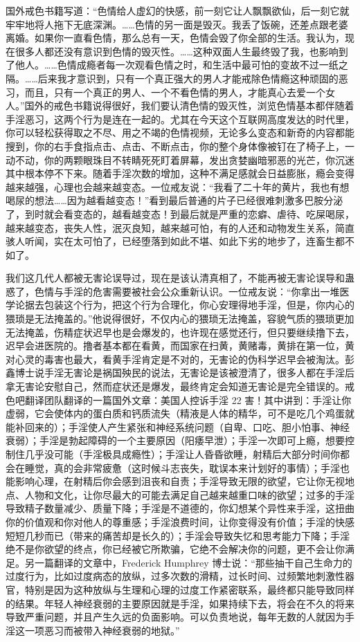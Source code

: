 国外戒色书籍写道：“色情给人虚幻的快感，前一刻它让人飘飘欲仙，后一刻它就牢牢地将人拖下无底深渊。……色情的另一面是毁灭。我丢了饭碗，还差点跟老婆离婚。如果你一直看色情，那么总有一天，色情会毁了你全部的生活。我认为，现在很多人都还没有意识到色情的毁灭性。……这种双面人生最终毁了我，也影响到了他人。……色情成瘾者每一次观看色情之时，和生活中最可怕的变故不过一纸之隔。……后来我才意识到，只有一个真正强大的男人才能戒除色情瘾这种顽固的恶习，而且，只有一个真正的男人、一个不看色情的男人，才能真心去爱一个女人。”国外的戒色书籍说得很好，我们要认清色情的毁灭性，浏览色情基本都伴随着手淫恶习，这两个行为是连在一起的。尤其在今天这个互联网高度发达的时代里，你可以轻松获得取之不尽、用之不竭的色情视频，无论多么变态和新奇的内容都能搜到，你的右手食指点击、点击、不断点击，你的整个身体像被钉在了椅子上，一动不动，你的两颗眼珠目不转睛死死盯着屏幕，发出贪婪幽暗邪恶的光芒，你沉迷其中根本停不下来。随着手淫次数的增加，这种不满足感就会日益膨胀，瘾会变得越来越强，心理也会越来越变态。一位戒友说：“我看了二十年的黄片，我也有想喝尿的想法……因为越看越变态！”看到最后普通的片子已经很难刺激多巴胺分泌了，到时就会看变态的，越看越变态！到最后就是严重的恋癖、虐待、吃屎喝尿，越来越变态，丧失人性，泯灭良知，越来越可怕，有的人还和动物发生关系，简直骇人听闻，实在太可怕了，已经堕落到如此不堪、如此下劣的地步了，连畜生都不如了。

我们这几代人都被无害论误导过，现在是该认清真相了，不能再被无害论误导和蛊惑了，色情与手淫的危害需要被社会公众重新认识。一位戒友说：“你拿出一堆医学论据去包装这个行为，把这个行为合理化，你心安理得地手淫，但是，你内心的猥琐是无法掩盖的。”他说得很好，不仅内心的猥琐无法掩盖，容貌气质的猥琐更加无法掩盖，伤精症状迟早也是会爆发的，也许现在感觉还行，但只要继续撸下去，迟早会进医院的。撸者基本都在看黄，而国家在扫黄，黄赌毒，黄排在第一位，黄对心灵的毒害也最大，看黄手淫肯定是不对的，无害论的伪科学迟早会被淘汰。彭鑫博士说手淫无害论是祸国殃民的说法，无害论是该被澄清了，很多人都在手淫后拿无害论安慰自己，然而症状还是爆发，最终肯定会知道无害论是完全错误的。戒色吧翻译团队翻译的一篇国外文章：美国人控诉手淫 22 害！其中讲到：手淫让你虚弱，它会使体内的蛋白质和钙质流失（精液是人体的精华，可不是吃几个鸡蛋就能补回来的）；手淫使人产生紧张和神经系统问题（自卑、口吃、胆小怕事、神经衰弱）；手淫是勃起障碍的一个主要原因（阳痿早泄）；手淫一次即可上瘾，想要控制住几乎没可能（手淫极具成瘾性）；手淫让人昏昏欲睡，射精后大部分时间你都会在睡觉，真的会非常疲惫（这时候斗志丧失，耽误本来计划好的事情）；手淫也能影响心理，在射精后你会感到沮丧和自责；手淫导致无限的欲望，它让你无视地点、人物和文化，让你尽最大的可能去满足自己越来越重口味的欲望；过多的手淫导致精子数量减少、质量下降；手淫是不道德的，你幻想某个异性来手淫，这扭曲你的价值观和你对他人的尊重感；手淫浪费时间，让你变得没有价值；手淫的快感短短几秒而已（带来的痛苦却是长久的）；手淫会导致失忆和思考能力下降；手淫绝不是你欲望的终点，你已经被它所欺骗，它绝不会解决你的问题，更不会让你满足。另一篇翻译的文章中，Frederick Humphrey 博士说：“那些抽干自己生命力的过度行为，比如过度病态的放纵，过多次数的滑精，过长时间、过频繁地刺激性器官，特别是因为这种放纵与生理和心理的过度工作紧密联系，最终都只能导致同样的结果。年轻人神经衰弱的主要原因就是手淫，如果持续下去，将会在不久的将来导致严重问题，并且产生久远的负面影响。可以负责地说，每年无数的人就因为手淫这一项恶习而被带入神经衰弱的地狱。”

